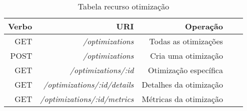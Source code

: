 \begin{table}[!htb]
    \centering
    \caption[Recurso Otimização]{Tabela recurso otimização
    \label{tab:tabela-optimization}}
    \begin{tabular}{rrrrr}
        \toprule
            Verbo & URI & Operação \\ 
        \midrule
            GET & \textit{/optimizations} & Todas as otimizações \\
            POST & \textit{/optimizations} &  Cria uma otimização \\
            GET & \textit{/optimizations/:id} & Otimização específica \\
            GET & \textit{/optimizations/:id/details} & Detalhes da otimização \\
            GET & \textit{/optimizations/:id/metrics} & Métricas da otimização \\
        \bottomrule
    \end{tabular}
\end{table}
